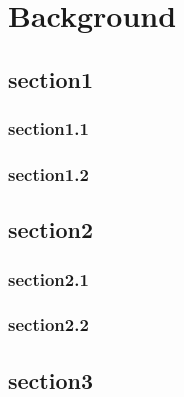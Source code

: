 \chapter{Background}
\label{chap:background}
\section{section1}
\subsection{section1.1}
\subsection{section1.2}
\section{section2}
\subsection{section2.1}
\subsection{section2.2}
\section{section3}
